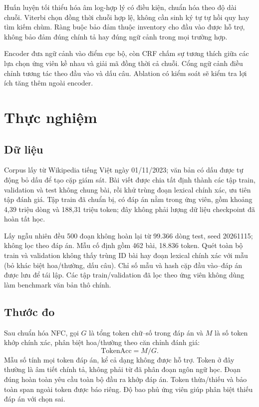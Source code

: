 \documentclass{article}
\begin{document}
Huấn luyện tối thiểu hóa âm log-hợp lý có điều kiện, chuẩn hóa theo độ dài chuỗi. Viterbi chọn đồng thời chuỗi hợp lệ, không cần sinh ký tự tự hồi quy hay tìm kiếm chùm. Ràng buộc bảo đảm thuộc inventory cho đầu vào được hỗ trợ, không bảo đảm đúng chính tả hay đúng ngữ cảnh trong mọi trường hợp.

Encoder đưa ngữ cảnh vào điểm cục bộ, còn CRF chấm sự tương thích giữa các lựa chọn ứng viên kề nhau và giải mã đồng thời cả chuỗi. Cổng ngữ cảnh điều chỉnh tương tác theo đầu vào và dấu câu. Ablation có kiểm soát sẽ kiểm tra lợi ích tăng thêm ngoài encoder.

\section{Thực nghiệm}
\subsection{Dữ liệu}
Corpus lấy từ Wikipedia tiếng Việt ngày 01/11/2023; văn bản có dấu được tự động bỏ dấu để tạo cặp giám sát. Bài viết được chia tất định thành các tập train, validation và test không chung bài, rồi khử trùng đoạn lexical chính xác, ưu tiên tập đánh giá. Tập train đã chuẩn bị, có đáp án nằm trong ứng viên, gồm khoảng 4,39 triệu dòng và 188,31 triệu token; đây không phải lượng dữ liệu checkpoint đã hoàn tất học.

Lấy ngẫu nhiên đều 500 đoạn không hoàn lại từ 99.366 dòng test, seed 20261115; không lọc theo đáp án. Mẫu cố định gồm 462 bài, 18.836 token. Quét toàn bộ train và validation không thấy trùng ID bài hay đoạn lexical chính xác với mẫu (bỏ khác biệt hoa/thường, dấu câu). Chỉ số mẫu và hash cặp đầu vào--đáp án được lưu để tái lập. Các tập train/validation đã lọc theo ứng viên không dùng làm benchmark văn bản thô chính.

\subsection{Thước đo}
Sau chuẩn hóa NFC, gọi $G$ là tổng token chữ--số trong đáp án và $M$ là số token khớp chính xác, phân biệt hoa/thường theo căn chỉnh đánh giá:
\begin{equation}
\mathrm{TokenAcc}=M/G.
\end{equation}
Mẫu số tính mọi token đáp án, kể cả dạng không được hỗ trợ. Token ở đây thường là âm tiết chính tả, không phải từ đã phân đoạn ngôn ngữ học. Đoạn đúng hoàn toàn yêu cầu toàn bộ đầu ra khớp đáp án. Token thừa/thiếu và bảo toàn span ngoài token được báo riêng. Độ bao phủ ứng viên giúp phân biệt thiếu đáp án với chọn sai.
\end{document}

